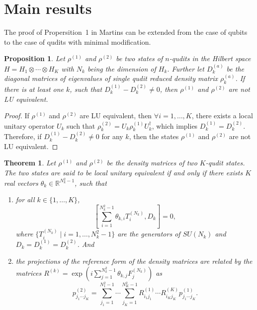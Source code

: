 \documentclass{article}
\newtheorem{theorem}{Theorem}
\newtheorem{proposition}{Proposition}
\begin{document}
\section{Main results}
The proof of Propersition~1 in Martins\cite{Martins_2015} can be extended
from the case of qubits to the case of qudits with minimal modification.
\begin{proposition}
  \label{prop:one}
  Let $\rho^{(1)}$ and $\rho^{(2)}$ be two states of $n$-qudits in the
  Hilbert space $H = H_1\otimes\cdots\otimes H_K$ with $N_k$ being the
  dimension of $H_k$.  Further let $D^{(a)}_k$ be the diagonal matrices
  of eigenvalues of single qudit reduced density matrix $\rho^{(a)}_k$.
  If there is at least one $k$, such that $D^{(1)}_k-D^{(2)}_k\ne 0$,
  then $\rho^{(1)}$ and $\rho^{(2)}$ are not LU equivalent.
\end{proposition}
\begin{proof}
  If $\rho^{(1)}$ and $\rho^{(2)}$ are LU equivalent, then
  $\forall i = 1,\ldots,K$, there exists a local unitary operator $U_k$
  such that $\rho^{(2)}_k = U_k\rho^{(1)}_kU_k^\dagger$, which implies
  $D^{(1)}_k = D^{(2)}_k$.  Therefore, if $D^{(1)}_k-D^{(2)}_k\ne 0$ for any
  $k$, then the states $\rho^{(1)}$ and $\rho^{(2)}$ are not LU equivalent.
\end{proof}

\begin{theorem}
  Let $\rho^{(1)}$ and $\rho^{(2)}$ be the density matrices of two $K$-qudit
  states.  The two states are said to be local unitary equivalent
  if and only if there exists $K$ real vectors
  $\theta_k\in \mathbb R^{N_k^2-1}$, such that
  \begin{enumerate}[label=(\roman*)]
  \item for all $k\in\{1,\ldots,K\}$,
    \begin{equation}
      \label{eq:commute_d}
      \left[\sum_{i=1}^{N_k^2-1}\theta_{k,i}T^{(N_k)}_i, D_k\right] = 0,
    \end{equation}
    where $\{T^{(N_k)}_i\mid i = 1,\ldots,N_k^2-1\}$ are the generators of
    $SU(N_k)$ and $D_k = D^{(1)}_k = D^{(2)}_k$. And
  \item the projections of the reference form of the density matrices are
    related by the matrices
    $R^{(k)} = \exp\left(i\sum_{j=1}^{N_k^2-1}\theta_{k,j}F^{(N_k)}_j\right)$
    as
    \begin{equation}
      \label{eq:p2_r_p1}
      p^{(2)}_{j_1\cdots j_K} =
      \sum_{j_1=1}^{N_1^2-1}\cdots\sum_{j_K=1}^{N_K^2-1}R^{(1)}_{i_1j_1}
      \cdots R^{(K)}_{i_Kj_K}p^{(1)}_{j_1\cdots j_K}.
    \end{equation}
  \end{enumerate}
\end{theorem}
\end{document}
